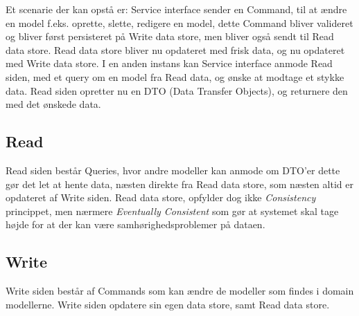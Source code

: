 Et scenarie der kan opstå er: Service interface sender en Command, til at ændre en model f.eks. oprette, slette, redigere en model, dette Command bliver valideret og bliver først persisteret på Write data store, men bliver også sendt til Read data store. Read data store bliver nu opdateret med frisk data, og nu opdateret med Write data store. I en anden instans kan Service interface anmode Read siden, med et query om en model fra Read data, og ønske at modtage et stykke data. Read siden opretter nu en DTO (Data Transfer Objects), og returnere den med det ønskede data.
\subsection{Read}

Read siden består Queries, hvor andre modeller kan anmode om DTO'er dette gør det let at hente data, næsten direkte fra Read data store, som næsten altid er opdateret af Write siden. Read data store, opfylder dog ikke \textit{Consistency} princippet, men nærmere \textit{Eventually Consistent} som gør at systemet skal tage højde for at der kan være samhørighedsproblemer på dataen. 
\subsection{Write}

Write siden består af Commands som kan ændre de modeller som findes i domain modellerne. Write siden opdatere sin egen data store, samt Read data store.

